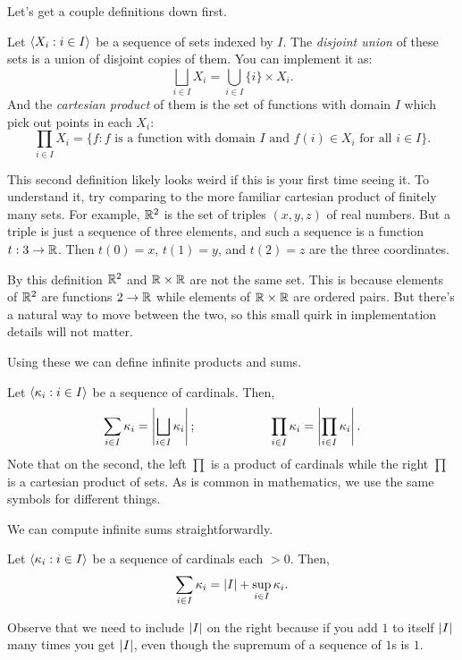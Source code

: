 \documentclass[10pt]{amsart}
\begin{document}
Let's get a couple definitions down first.

\begin{definition}
Let ${\left\langle X_i : i \in I \right\rangle}$ be a sequence of sets indexed by $I$. The \emph{disjoint union} of these sets is a union of disjoint copies of them. You can implement it as:
\[
\bigsqcup_{i \in I} X_i = \bigcup_{i \in I} \{i\} \times X_i. 
\]
And the \emph{cartesian product} of them is the set of functions with domain $I$ which pick out points in each $X_i$:
\[
\prod_{i \in I} X_i = \{ f : f \text{ is a function with domain } I \text{ and } f(i) \in X_i \text{ for all } i \in I\}.
\]
\end{definition}

This second definition likely looks weird if this is your first time seeing it. To understand it, try comparing to the more familiar cartesian product of finitely many sets. For example, $\mathbb{R}^2$ is the set of triples $(x,y,z)$ of real numbers. But a triple is just a sequence of three elements, and such a sequence is a function $t : 3 \to \mathbb{R}$. Then $t(0) = x$, $t(1) = y$, and $t(2) = z$ are the three coordinates. 

By this definition $\mathbb{R}^2$ and $\mathbb{R} \times \mathbb{R}$ are not the same set. This is because elements of $\mathbb{R}^2$ are functions $2 \to \mathbb{R}$ while elements of $\mathbb{R} \times \mathbb{R}$ are ordered pairs. But there's a natural way to move between the two, so this small quirk in implementation details will not matter.

Using these we can define infinite products and sums.

\begin{definition}
Let ${\left\langle  \kappa_i : i \in I \right\rangle}$ be a sequence of cardinals. Then,
\[
\sum_{i \in I} \kappa_i = \left\lvert \bigsqcup_{i \in I} \kappa_i \right\rvert; \qquad\qquad\qquad
\prod_{i \in I} \kappa_i = \left\lvert \prod_{i \in I} \kappa_i \right\rvert.
\]
Note that on the second, the left $\prod$ is a product of cardinals while the right $\prod$ is a cartesian product of sets. As is common in mathematics, we use the same symbols for different things.
\end{definition}

We can compute infinite sums straightforwardly.

\begin{proposition}
Let ${\left\langle  \kappa_i : i \in I \right\rangle}$ be a sequence of cardinals each $> 0$. Then,
\[
\sum_{i \in I} \kappa_i = \left\lvert I \right\rvert + \sup_{i \in I} \kappa_i.
\]
\end{proposition}

Observe that we need to include $\left\lvert I \right\rvert$ on the right because if you add $1$ to itself $\left\lvert I \right\rvert$ many times you get $\left\lvert I \right\rvert$, even though the supremum of a sequence of $1$s is $1$.
\end{document}
